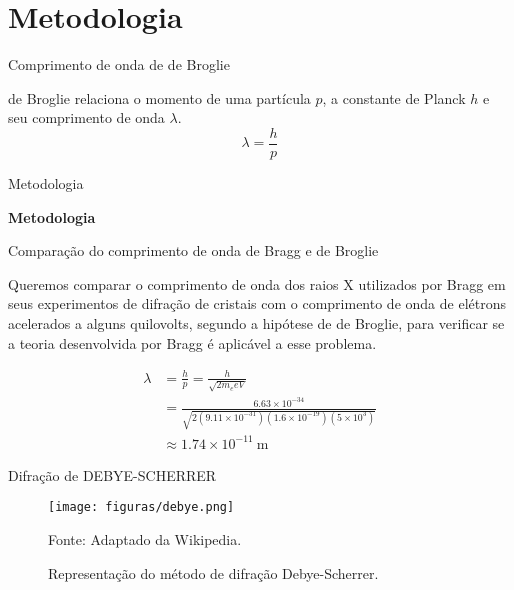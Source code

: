 \section{Metodologia}


\begin{frame}{Comprimento de onda de de Broglie}

    de Broglie relaciona o momento de uma partícula $p$, a constante de Planck $h$ e seu comprimento de onda $\lambda$.        
    \begin{equation}
        \lambda = \frac{h}{p}
    \end{equation}

\end{frame}

\begin{frame}{Metodologia}
    \Huge{\centerline{\textbf{Metodologia}}}
\end{frame}

\begin{frame}{Comparação do comprimento de onda de Bragg e de Broglie}

Queremos comparar o comprimento de onda dos raios X utilizados por Bragg em seus experimentos de difração de cristais com o comprimento de onda de elétrons acelerados a alguns quilovolts, segundo a hipótese de de Broglie, para verificar se a teoria desenvolvida por Bragg é aplicável a esse problema.

\begin{equation}
\begin{aligned}
\lambda &= \frac{h}{p} = \frac{h}{\sqrt{2 m_e e V}} \\[6pt]
        &= \frac{6.63 \times 10^{-34}}
        {\sqrt{2 (9.11 \times 10^{-31})(1.6 \times 10^{-19})(5 \times 10^3)}} \\[6pt]
        &\approx 1.74 \times 10^{-11} \ \text{m}
\end{aligned}
\end{equation}
\end{frame}

\begin{frame}{Difração de DEBYE-SCHERRER}

        \begin{center}
        \begin{figure}
        \caption{Representação do método de difração Debye-Scherrer.}
        \vspace*{-0.25cm}
        \texttt{[image: figuras/debye.png]}\par
        {\scriptsize Fonte: Adaptado da Wikipedia.}
        \end{figure}
        \end{center}
    
\end{frame}



